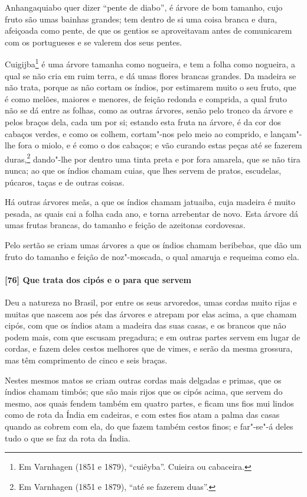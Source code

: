 \begin{linenumbers}
Anhangaquiabo quer dizer ``pente de diabo'', é árvore de bom tamanho, cujo fruto são umas
bainhas grandes; tem dentro de si uma coisa branca e dura, afeiçoada como pente, de que os
gentios se aproveitavam antes de comunicarem com os portugueses e se valerem dos seus
pentes.

Cuigijba\footnote{ Em Varnhagen (1851 e 1879), ``cuiêyba''. Cuieira ou cabaceira.} é uma
árvore tamanha como nogueira, e tem a folha como nogueira, a qual se não cria em ruim
terra, e dá umas flores brancas grandes. Da madeira se não trata, porque as não cortam os
índios, por estimarem muito o seu fruto, que é como melões, maiores e menores, de feição
redonda e comprida, a qual fruto não se dá entre as folhas, como as outras árvores, senão
pelo tronco da árvore e pelos braços dela, cada um por si; estando esta fruta na árvore, é
da cor dos cabaços verdes, e como os colhem, cortam"-nos pelo meio ao comprido, e
lançam"-lhe fora o miolo, e é como o dos cabaços; e vão curando estas peças até se fazerem
duras,\footnote{ Em Varnhagen (1851 e 1879), ``até se fazerem duas''.} dando"-lhe por
dentro uma tinta preta e por fora amarela, que se não tira nunca; ao que os índios chamam
cuias, que lhes servem de pratos, escudelas, púcaros, taças e de outras coisas.

Há outras árvores meãs, a que os índios chamam jatuaiba, cuja madeira é muito pesada, as
quais cai a folha cada ano, e torna arrebentar de novo. Esta árvore dá umas frutas
brancas, do tamanho e feição de azeitonas cordovesas.

Pelo sertão se criam umas árvores a que os índios chamam beribebas, que dão um fruto do
tamanho e feição de noz"-moscada, o qual amaruja e requeima como ela.

\paragraph{[76] Que trata dos cipós e o para que servem}\quad
Deu a natureza no Brasil, por entre os seus arvoredos, umas cordas muito rijas e muitas
que nascem aos pés das árvores e atrepam por elas acima, a que chamam cipós, com que os
índios atam a madeira das suas casas, e os brancos que não podem mais, com que escusam
pregadura; e em outras partes servem em lugar de cordas, e fazem deles cestos melhores que
de vimes, e serão da mesma grossura, mas têm comprimento de cinco e seis braças.

Nestes mesmos matos se criam outras cordas mais delgadas e primas, que os índios chamam
timbós; que são mais rijos que os cipós acima, que servem do mesmo, aos quais fendem
também em quatro partes, e ficam uns fios mui lindos como de rota da Índia em cadeiras, e
com estes fios atam a palma das casas quando as cobrem com ela, do que fazem também cestos
finos; e far"-se"-á deles tudo o que se faz da rota da Índia.


\end{linenumbers}
